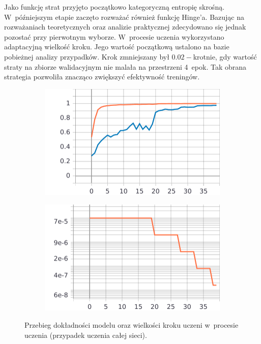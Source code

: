 Jako funkcję strat przyjęto początkowo kategoryczną entropię skrośną. W~późniejszym etapie zaczęto rozważać również funkcję Hinge'a. Bazując na rozważaniach teoretycznych \cite{rosasco} oraz analizie praktycznej \cite{janocha} zdecydowano się jednak pozostać przy pierwotnym wyborze. W~procesie uczenia wykorzystano adaptacyjną wielkość kroku. Jego wartość początkową ustalono na bazie pobieżnej analizy przypadków. Krok zmniejszany był \mbox{$0.02-$krotnie}, gdy wartość straty na zbiorze walidacyjnym nie malała na przestrzeni 4~epok. Tak obrana strategia pozwoliła znacząco zwiększyć efektywność treningów.

\vspace{0.5cm}
\begin{figure}[h]
    \centering
    \begin{subfigure}{.5\textwidth}
        \centering
        \includegraphics[scale=0.6]{img/adaptive_lr_accuracy.pdf}
      \end{subfigure}%
      \begin{subfigure}{.5\textwidth}
        \centering
        \includegraphics[scale=0.6]{img/adaptive_lr_lr.pdf}
      \end{subfigure}
      \captionsetup{format=plain,justification=centering}
      \caption{\small Przebieg dokładności modelu oraz wielkości kroku uczeni w~procesie uczenia (przypadek uczenia całej sieci).}
    \label{adaptive_lr_img}
\end{figure}
\vspace{0.5cm}




